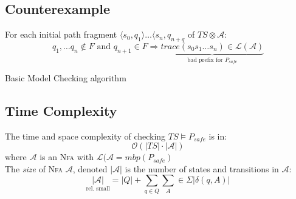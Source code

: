 \documentclass[a4paper, 10pt]{article}
\begin{document}
\subsection*{Counterexample}
\begin{shaded}
    For each initial path fragment $\langle s_0,q_1\rangle\dots\langle s_n,q_{n+q}$ of $TS\otimes\mathcal{A}:$
    \[
    q_1,\dots q_n\not\in F \textrm{ and } q_{n+1}\in F \Rightarrow \underset{\textrm{bad prefix for } P_{safe}}{\underbrace{trace(s_0s_1\dots s_n)\in\mathcal{L(\mathcal{A})}}}
    \]
\end{shaded}

\begin{algorithm}[H]
 \SetAlgoLined
 \caption{Basic Model Checking algorithm}
\end{algorithm}

\subsection*{Time Complexity}
\begin{shaded}
    The time and space complexity of checking $TS\models P_{safe}$ is in:
    \[ \mathcal{O} (|TS|\cdot|\mathcal{A}|) \]
    where $\mathcal{A}$ is an \textsc{Nfa} with $\mathcal{L}(\mathcal{A}=mbp(P_{safe})$
\\ The \emph{size} of \textsc{Nfa} $\mathcal{A}$, denoted $|\mathcal{A}|$ is the number of states and transitions in $\mathcal{A}:$
\[ \underset{\textrm{rel. small}}{|\mathcal{A}|} = |Q| + \sum_{q\in Q} \sum_{A}\in\Sigma |\delta(q,A)| \]
\end{shaded}
\end{document}
